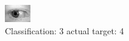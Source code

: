 \begin{figure}[h!]
\begin{center}
\includegraphics[width=0.60\columnwidth]{figures/ID745_class_3_target_4.png}
\end{center}
\caption{ Classification: 3 actual target: 4}
\label{fig:ID745_class_3_target_4}
\end{figure}
